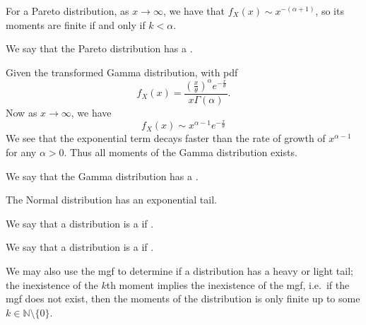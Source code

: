 \documentclass[notoc,notitlepage]{tufte-book}
\begin{document}
\begin{eg}
  For a Pareto distribution, as $x \to \infty$, we have that $f_X(x) \sim x^{-(\alpha + 1)}$, so its moments are finite if and only if $k < \alpha$.

  We say that the Pareto distribution has a .
\end{eg}

\begin{eg}
  Given the transformed Gamma distribution, with pdf
  \begin{equation*}
    f_X(x) = \frac{{\left( \frac{x}{\theta} \right)}^\alpha e^{- \frac{x}{\theta}}}{x \Gamma(\alpha)}.
  \end{equation*}
  Now as $x \to \infty$, we have
  \begin{equation*}
    f_X(x) \sim x^{\alpha - 1} e^{-\frac{x}{\theta}}
  \end{equation*}
  We see that the exponential term decays faster than the rate of growth of $x^{\alpha - 1}$ for any $\alpha > 0$. Thus all moments of the Gamma distribution exists.

  We say that the Gamma distribution has a .
\end{eg}

\begin{ex}
  The Normal distribution has an exponential tail.
\end{ex}

\begin{defn}\label{defn:heavy_tails_light_tails}
  We say that a distribution is a  if .

  We say that a distribution is a  if .
\end{defn}

\begin{note}
  We may also use the mgf to determine if a distribution has a heavy or light tail; the inexistence of the $k$th moment implies the inexistence of the mgf, i.e.\ if the mgf does not exist, then the moments of the distribution is only finite up to some $k \in \mathbb{N} \setminus \{0\}$.
\end{note}
\end{document}
